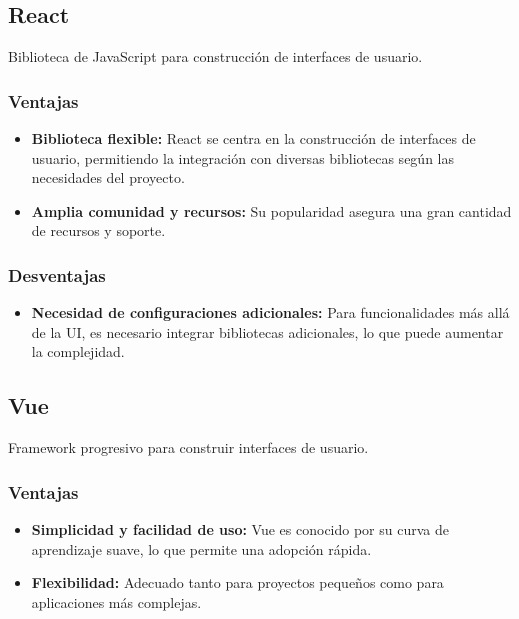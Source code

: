 \subsection{React}
Biblioteca de JavaScript para construcción de interfaces de usuario.

\subsubsection{Ventajas}
\begin{itemize}
    \item \textbf{Biblioteca flexible:} React se centra en la construcción de interfaces de usuario, permitiendo la integración con diversas bibliotecas según las necesidades del proyecto.
    
    \item \textbf{Amplia comunidad y recursos:} Su popularidad asegura una gran cantidad de recursos y soporte.
\end{itemize}

\subsubsection{Desventajas}
\begin{itemize}
    \item \textbf{Necesidad de configuraciones adicionales:} Para funcionalidades más allá de la UI, es necesario integrar bibliotecas adicionales, lo que puede aumentar la complejidad.
\end{itemize}

\subsection{Vue}
Framework progresivo para construir interfaces de usuario.

\subsubsection{Ventajas}
\begin{itemize}
    \item \textbf{Simplicidad y facilidad de uso:} Vue es conocido por su curva de aprendizaje suave, lo que permite una adopción rápida.
    
    \item \textbf{Flexibilidad:} Adecuado tanto para proyectos pequeños como para aplicaciones más complejas.
\end{itemize}


